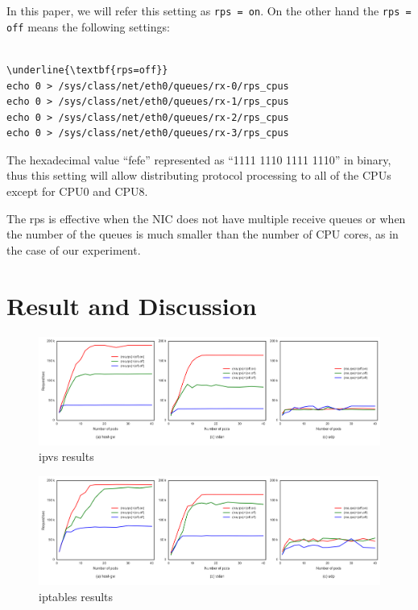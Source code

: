 In this paper, we will refer this setting as {\tt rps = on}.
On the other hand the {\tt rps = off} means the following settings:

\begin{center}
\begin{minipage}{0.8\columnwidth}
\begin{Verbatim}[commandchars=\\\{\}]

\underline{\textbf{rps=off}}
echo 0 > /sys/class/net/eth0/queues/rx-0/rps_cpus
echo 0 > /sys/class/net/eth0/queues/rx-1/rps_cpus
echo 0 > /sys/class/net/eth0/queues/rx-2/rps_cpus
echo 0 > /sys/class/net/eth0/queues/rx-3/rps_cpus

\end{Verbatim}
\end{minipage}
\end{center}

The hexadecimal value \enquote{fefe} represented as \enquote{1111 1110 1111 1110} in binary, 
thus this setting will allow distributing protocol processing to all of the CPUs except for CPU0 and CPU8.

The rps is effective when the NIC does not have multiple receive queues or when the number of the queues is 
much smaller than the number of CPU cores, as in the case of our experiment.

\section{Result and Discussion}\label{Result and Discussion}

\begin{figure}
\includegraphics[width=\textwidth]{Figs/ipvs_3figs}
\caption{ipvs results}
\label{fig:ipvs3figs}
\end{figure}

\begin{figure}
\includegraphics[width=\textwidth]{Figs/iptables_3figs}
\caption{iptables results}
\label{fig:iptabls3figs}
\end{figure}


